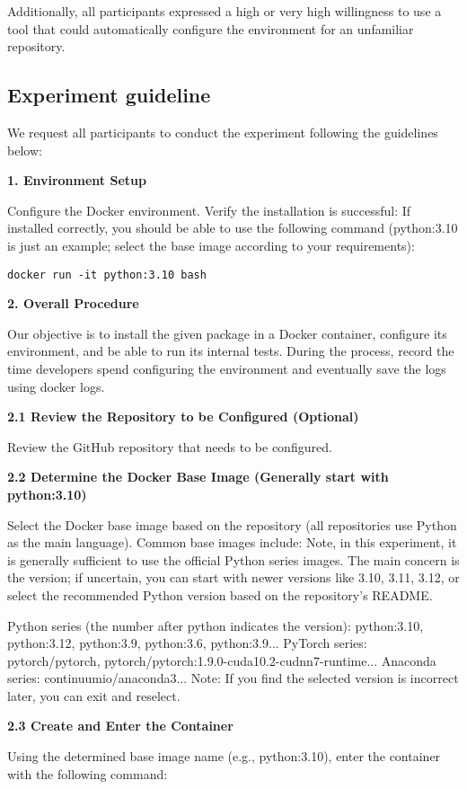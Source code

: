 Additionally, all participants expressed a high or very high willingness to use a tool that could automatically configure the environment for an unfamiliar repository.

\subsection{Experiment guideline}
We request all participants to conduct the experiment following the guidelines below:

\textbf{1. Environment Setup}

Configure the Docker environment. Verify the installation is successful: If installed correctly, you should be able to use the following command (python:3.10 is just an example; select the base image according to your requirements):

\texttt{docker run -it python:3.10 bash}

\textbf{2. Overall Procedure}

Our objective is to install the given package in a Docker container, configure its environment, and be able to run its internal tests. During the process, record the time developers spend configuring the environment and eventually save the logs using docker logs.

\textbf{2.1 Review the Repository to be Configured (Optional)}

Review the GitHub repository that needs to be configured.

\textbf{2.2 Determine the Docker Base Image (Generally start with python:3.10)}

Select the Docker base image based on the repository (all repositories use Python as the main language). Common base images include: Note, in this experiment, it is generally sufficient to use the official Python series images. The main concern is the version; if uncertain, you can start with newer versions like 3.10, 3.11, 3.12, or select the recommended Python version based on the repository's README.

Python series (the number after python indicates the version): python:3.10, python:3.12, python:3.9, python:3.6, python:3.9...
PyTorch series: pytorch/pytorch, pytorch/pytorch:1.9.0-cuda10.2-cudnn7-runtime...
Anaconda series: continuumio/anaconda3...
Note: If you find the selected version is incorrect later, you can exit and reselect.

\textbf{2.3 Create and Enter the Container}

Using the determined base image name (e.g., python:3.10), enter the container with the following command:

